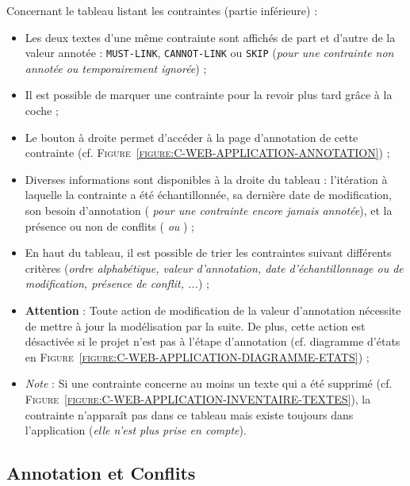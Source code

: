 			Concernant le tableau listant les contraintes (partie inférieure) :
			\begin{itemize}
				\item Les deux textes d'une même contrainte sont affichés de part et d'autre de la valeur annotée : \textcolor{colorApplicationMUSTLINK}{\texttt{MUST-LINK}}, \textcolor{colorApplicationCANNOTLINK}{\texttt{CANNOT-LINK}} ou \texttt{SKIP} (\textit{pour une contrainte non annotée ou temporairement ignorée}) ;
				\item Il est possible de marquer une contrainte pour la revoir plus tard grâce à la coche \textguillemets{\textcolor{colorApplicationREVIEW}{\faCheckSquare}} ;
				\item Le bouton \textguillemets{\faAngleRight} à droite permet d'accéder à la page d'annotation de cette contrainte (cf. \textsc{Figure~\ref{figure:C-WEB-APPLICATION-ANNOTATION}}) ;
				\item Diverses informations sont disponibles à la droite du tableau : l'itération à laquelle la contrainte a été échantillonnée, sa dernière date de modification, son besoin d'annotation (\textit{\textguillemets{\faQuestion} pour une contrainte encore jamais annotée}), et la présence ou non de conflits (\textit{\textguillemets{\textcolor{colorApplicationMUSTLINK}{\faCheck}} ou \textguillemets{\textcolor{colorApplicationERROR}{\faExclamation}}}) ;
				\item En haut du tableau, il est possible de trier les contraintes suivant différents critères (\textit{ordre alphabétique, valeur d'annotation, date d'échantillonnage ou de modification, présence de conflit, ...}) ;
				\item \textbf{Attention} : Toute action de modification de la valeur d'annotation nécessite de mettre à jour la modélisation par la suite.
				De plus, cette action est désactivée si le projet n'est pas à l'étape d'annotation (cf. diagramme d'états en \textsc{Figure~\ref{figure:C-WEB-APPLICATION-DIAGRAMME-ETATS}}) ;
				\item \textit{Note} : Si une contrainte concerne au moins un texte qui a été supprimé (cf. \textsc{Figure~\ref{figure:C-WEB-APPLICATION-INVENTAIRE-TEXTES}}), la contrainte n'apparaît pas dans ce tableau mais existe toujours dans l'application (\textit{elle n'est plus prise en compte}).
			\end{itemize}
	
	
	\newpage
	\subsection{Annotation et Conflits}
	\label{annex:C.2.4-DESCRIPTION-IMPLEMENTATION-INTERACTIVE-CLUSTERING-GUI-ANNOTATION}
	
